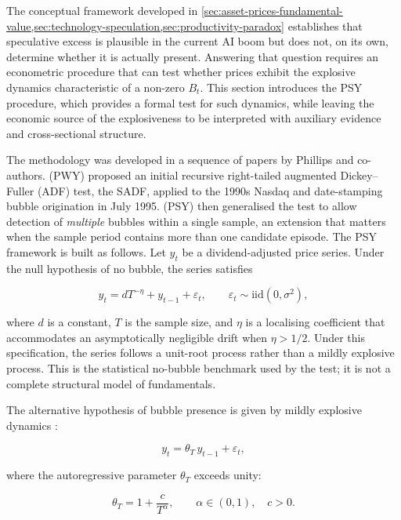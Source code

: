 The conceptual framework developed in \cref{sec:asset-prices-fundamental-value,sec:technology-speculation,sec:productivity-paradox} establishes that speculative excess is plausible in the current AI boom but does not, on its own, determine whether it is actually present. Answering that question requires an econometric procedure that can test whether prices exhibit the explosive dynamics characteristic of a non-zero $B_t$. This section introduces the PSY procedure, which provides a formal test for such dynamics, while leaving the economic source of the explosiveness to be interpreted with auxiliary evidence and cross-sectional structure.

The methodology was developed in a sequence of papers by Phillips and co-authors. \citet{phillipsWuYu2011} (PWY) proposed an initial recursive right-tailed augmented Dickey--Fuller (ADF) test, the SADF, applied to the 1990s Nasdaq and date-stamping bubble origination in July 1995. \citet{phillipsShiYu2015a,phillipsShiYu2015b} (PSY) then generalised the test to allow detection of \emph{multiple} bubbles within a single sample, an extension that matters when the sample period contains more than one candidate episode. The PSY framework is built as follows. Let $y_t$ be a dividend-adjusted price series. Under the null hypothesis of no bubble, the series satisfies

\begin{equation}
y_t = dT^{-\eta} + y_{t-1} + \varepsilon_t, \qquad \varepsilon_t \sim \text{iid}(0, \sigma^2),
\label{eq:psy-null}
\end{equation}

\noindent where $d$ is a constant, $T$ is the sample size, and $\eta$ is a localising coefficient that accommodates an asymptotically negligible drift when $\eta > 1/2$. Under this specification, the series follows a unit-root process rather than a mildly explosive process. This is the statistical no-bubble benchmark used by the test; it is not a complete structural model of fundamentals.

The alternative hypothesis of bubble presence is given by mildly explosive dynamics \citep{phillipsMagdalinos2007}:

\begin{equation}
y_t = \theta_T \, y_{t-1} + \varepsilon_t,
\label{eq:psy-alternative}
\end{equation}

\noindent where the autoregressive parameter $\theta_T$ exceeds unity:

\begin{equation}
\theta_T = 1 + \frac{c}{T^{\alpha}}, \qquad \alpha \in (0,1), \quad c > 0.
\label{eq:mildly-explosive-root}
\end{equation}

